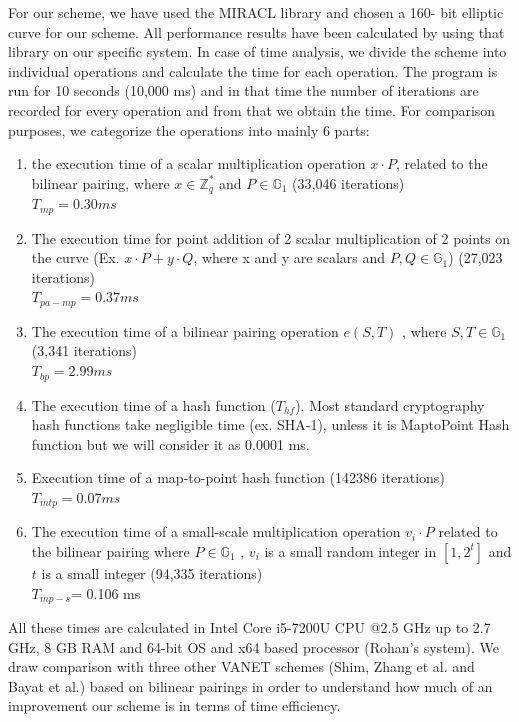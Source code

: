\documentclass[10pt,journal,letterpaper]{IEEEtran}
\begin{document}
For our scheme, we have used the MIRACL library and chosen a 160-
bit elliptic curve for our scheme. All performance results have been
calculated by using that library on our specific system. In case of
time analysis, we divide the scheme into individual operations and
calculate the time for each operation. The program is run for 10
seconds (10,000 ms) and in that time the number of iterations are
recorded for every operation and from that we obtain the time. For
comparison purposes, we categorize the operations into mainly 6
parts:
\begin{enumerate}
\setlength\itemsep{0.65em}
    \item the execution time of a scalar multiplication operation $x\cdot P$, related to the bilinear pairing, where $x\in \mathbb{Z}_q^*$ and $P \in \mathbb{G}_1$ (33,046 iterations) \\ $T_{mp} = 0.30 ms$
    \item The execution time for point addition of 2 scalar multiplication of 2 points on the curve (Ex. $x\cdot P + y\cdot Q$, where x and y are scalars and $P,Q \in \mathbb{G}_1$) (27,023 iterations)\\
    $T_{pa-mp} = 0.37 ms$
    \item The execution time of a bilinear pairing operation $e(S,T)$ , where $S,T \in \mathbb{G}_1$ (3,341 iterations)\\
    $ T_{bp} = 2.99 ms$
    \item The execution time of a hash function ($T_{hf}$). Most standard cryptography hash functions take negligible time (ex. SHA-1), unless it is MaptoPoint Hash function but we will consider it as 0.0001 ms.
    \item Execution time of a map-to-point hash function (142386 iterations)\\
    $T_{mtp} = 0.07ms$
    \item The execution time of a small-scale multiplication operation $v_i \cdot P$
related to the bilinear pairing where $P \in \mathbb{G}_1$ , $v_i$ is a small random integer in $[1,2^t]$ and $t$ is a small integer (94,335 iterations)\\
$T_{mp-s}$= 0.106 ms
\end{enumerate}
All these times are calculated in Intel Core i5-7200U CPU @2.5 GHz
up to 2.7 GHz, 8 GB RAM and 64-bit OS and x64 based processor
(Rohan’s system). We draw comparison with three other VANET
schemes (Shim\cite{r1}, Zhang et al.\cite{r13} and Bayat et
al.\cite{r3}) based on bilinear pairings in order to understand how
much of an improvement our scheme is in terms of time efficiency.
\end{document}
